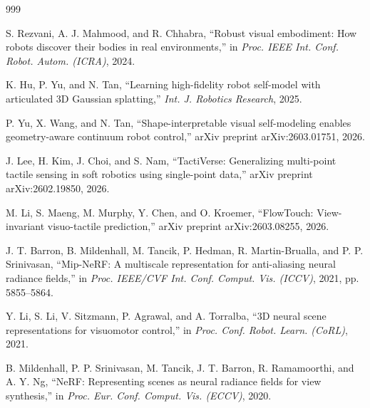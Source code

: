 \documentclass[12pt,a4paper,oneside]{report}
\begin{document}
\begin{thebibliography}{999}

S. Rezvani, A. J. Mahmood, and R. Chhabra, ``Robust visual embodiment: How robots discover their bodies in real environments,'' in \textit{Proc. IEEE Int. Conf. Robot. Autom. (ICRA)}, 2024.




K. Hu, P. Yu, and N. Tan, ``Learning high-fidelity robot self-model with articulated {3D} Gaussian splatting,'' \textit{Int. J. Robotics Research}, 2025.




P. Yu, X. Wang, and N. Tan, ``Shape-interpretable visual self-modeling enables geometry-aware continuum robot control,'' arXiv preprint arXiv:2603.01751, 2026.




J. Lee, H. Kim, J. Choi, and S. Nam, ``{TactiVerse}: Generalizing multi-point tactile sensing in soft robotics using single-point data,'' arXiv preprint arXiv:2602.19850, 2026.




M. Li, S. Maeng, M. Murphy, Y. Chen, and O. Kroemer, ``{FlowTouch}: View-invariant visuo-tactile prediction,'' arXiv preprint arXiv:2603.08255, 2026.




J. T. Barron, B. Mildenhall, M. Tancik, P. Hedman, R. Martin-Brualla, and P. P. Srinivasan, ``{Mip-NeRF}: A multiscale representation for anti-aliasing neural radiance fields,'' in \textit{Proc. IEEE/CVF Int. Conf. Comput. Vis. (ICCV)}, 2021, pp. 5855--5864.




Y. Li, S. Li, V. Sitzmann, P. Agrawal, and A. Torralba, ``{3D} neural scene representations for visuomotor control,'' in \textit{Proc. Conf. Robot. Learn. (CoRL)}, 2021.




B. Mildenhall, P. P. Srinivasan, M. Tancik, J. T. Barron, R. Ramamoorthi, and A. Y. Ng, ``NeRF: Representing scenes as neural radiance fields for view synthesis,'' in \textit{Proc. Eur. Conf. Comput. Vis. (ECCV)}, 2020.




\end{thebibliography}
\end{document}
